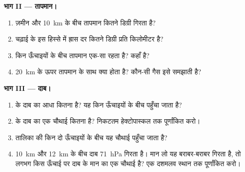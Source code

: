 \begin{problem}
\noindent\textbf{भाग II --- तापमान।}\par\nopagebreak
\begin{enumerate}[resume, beginpenalty=10000]
  \item ज़मीन और \qty{10}{km} के बीच तापमान कितने डिग्री गिरता है?
  \item चढ़ाई के इस हिस्से में ह्रास दर कितने डिग्री प्रति किलोमीटर
        है?
  \item किन ऊँचाइयों के बीच तापमान एक-सा रहता है?  कहाँ
        है?
  \item \qty{20}{km} के ऊपर तापमान के साथ क्या होता है? कौन-सी गैस इसे समझाती
        है?
\end{enumerate}

\noindent\textbf{भाग III --- दाब।}\par\nopagebreak
\begin{enumerate}[resume, beginpenalty=10000]
  \item {} के दाब का आधा कितना है? यह किन ऊँचाइयों के बीच पहुँचा जाता
        है?
  \item {} के दाब का एक चौथाई कितना है? निकटतम हेक्टोपास्कल तक पूर्णांकित
        करो।
  \item तालिका की किन दो ऊँचाइयों के बीच यह चौथाई पहुँचा जाता है?
  \item \qty{10}{km} और \qty{12}{km} के बीच दाब \qty{71}{hPa} गिरता है। मान लो
        यह बराबर-बराबर गिरता है, तो लगभग किस ऊँचाई पर दाब  के मान का एक
        चौथाई है? एक दशमलव स्थान तक पूर्णांकित
        करो।
\end{enumerate}
\end{problem}
